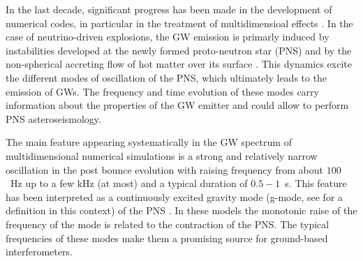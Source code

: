 In the last decade, significant progress has been made in the development of numerical codes, {in particular in the treatment of multidimensioal effects \citep{BMueller:2020}.}
In the case of  neutrino-driven explosions, the GW emission is {primarly induced by instabilities developed at the newly formed proto-neutron star (PNS) and by the non-spherical accreting flow of hot matter over its surface \citep{Kotake:2017}.  This} dynamics excite the different modes of oscillation of the PNS{, which ultimately leads to the emission of GWs. The frequency and time evolution of these modes carry information about the
properties of the GW emitter and could allow to perform PNS asteroseismology. }




{The main feature appearing systematically in the GW spectrum of multidimensional numerical simulations is a strong and relatively narrow {\mab oscillation} in the post bounce evolution with raising frequency
from about $100$~Hz up to a few kHz (at most) and a typical duration of $0.5-1$~s. This feature has been interpreted as a continuously excited gravity mode (g-mode, see \citep{kokkotas,Friedman:2013} for a definition in this context) of the PNS \cite{murphy:09, mueller:13gw, Cerda:2013, Yakunin:2015, Kuroda:2016, Andresen:2017}. In these models the monotonic raise of the frequency of the mode is related to the contraction of the PNS.} The {typical} frequencies of {these} modes make them {a} promising {source} for ground-based interferometers. 
 
